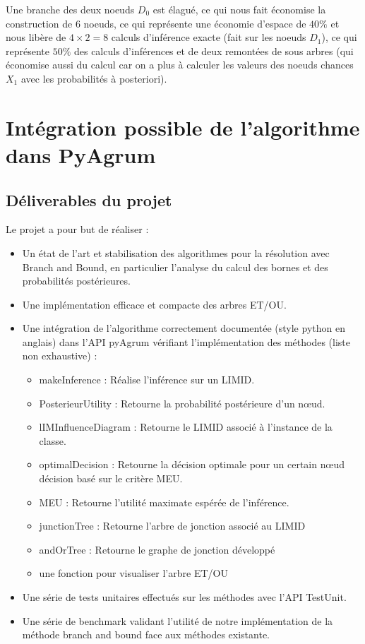 \documentclass[12pt]{article}
\begin{document}
Une branche des deux noeuds $D_0$ est élagué, ce qui nous fait économise la construction de 6 noeuds, ce qui représente une économie d'espace de $40\%$ et nous libère de $4\times 2=8$ calculs d'inférence exacte (fait sur les noeuds $D_1$), ce qui représente $50\%$ des calculs d'inférences et de deux remontées de sous arbres (qui économise aussi du calcul car on a plus à calculer les valeurs des noeuds chances $X_1$ avec les probabilités à posteriori).
\section{Intégration possible de l'algorithme dans PyAgrum}
\subsection{Déliverables du projet}
Le projet a pour but de réaliser :
\begin{itemize}
\item Un état de l'art et stabilisation des algorithmes pour la résolution avec Branch and Bound, en particulier l'analyse du calcul des bornes et des probabilités postérieures.
\item Une implémentation efficace et compacte des arbres ET/OU.

\item Une intégration de l'algorithme correctement documentée (style python en anglais) dans l'API pyAgrum vérifiant l'implémentation des méthodes (liste non exhaustive) :
\begin{itemize}
    \item makeInference : Réalise l'inférence sur un LIMID.
    \item PosterieurUtility : Retourne la probabilité postérieure d'un nœud.
    \item lIMInfluenceDiagram : Retourne le LIMID associé à l'instance de la classe.
    \item optimalDecision : Retourne la décision optimale pour un certain nœud décision basé sur le critère MEU.
    \item MEU : Retourne l'utilité maximate espérée de l'inférence.
    \item junctionTree : Retourne l'arbre de jonction associé au LIMID
    \item andOrTree : Retourne le graphe de jonction développé
    \item une fonction pour visualiser l'arbre ET/OU
\end{itemize}
\item Une série de tests unitaires effectués sur les méthodes avec l'API TestUnit.
\item Une série de benchmark validant l'utilité de notre implémentation de la méthode branch and bound face aux méthodes existante.
\end{itemize}
\end{document}
